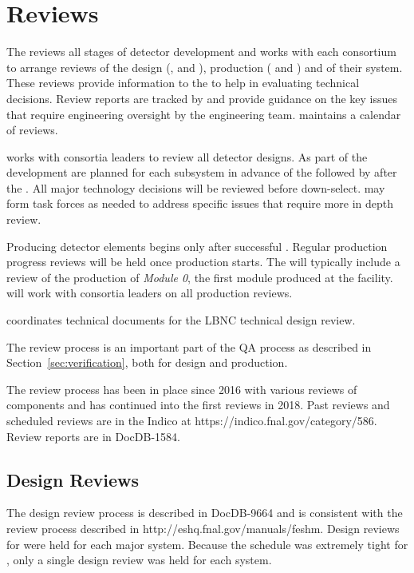 \chapter{Reviews}
\label{vl:tc-review}

The  reviews all stages of detector development and works
with each consortium to arrange reviews of the design (,
 and ), production ( and
) and  of their system.  These reviews provide
information to the  to help in evaluating technical
decisions.  Review reports are tracked by  and provide
guidance on the key issues that require engineering oversight by the
 engineering team.  maintains a calendar of
 reviews.

 works with consortia leaders to review all detector
designs.  As part of the  development  are
planned for each subsystem in advance of the  followed by
 after the .  All major technology decisions
will be reviewed before down-select.   may form task forces
as needed to address specific issues that require more in depth
review.


Producing detector elements begins only after
successful . Regular production progress
reviews will be held once production starts. The 
will typically include a review of the production of \textit{Module 0}, the
first module produced at the facility.  will work with
consortia leaders on all production reviews.

 coordinates technical documents for the LBNC
technical design review.

The review process is an important part of the  QA process
as described in Section~\ref{sec:verification}, both for
design and production.

The review process has been in place since 2016 with various reviews
of  components and has continued into the first 
reviews in 2018. Past reviews and scheduled reviews are in the
 Indico at https://indico.fnal.gov/category/586.
Review reports are in DocDB-1584.

\section{Design Reviews}

The  design review process is described in DocDB-9664
and is consistent with the \fnal review process described in
http://eshq.fnal.gov/manuals/feshm. Design reviews for  were held for each
major system. Because the schedule was extremely tight for , only a single design review
was held for each system.

